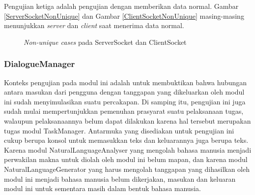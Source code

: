 Pengujian ketiga adalah pengujian dengan memberikan data normal.
Gambar \ref{ServerSocketNonUnique} dan Gambar \ref{ClientSocketNonUnique} masing-masing menunjukkan \textit{server} dan \textit{client} saat menerima data normal.

\begin{figure}
\centering
{}
\caption{\textit{Non-unique cases} pada ServerSocket dan ClientSocket}
\label{SocketNonUnique}
\end{figure}


\subsubsection*{DialogueManager}

Konteks pengujian pada modul ini adalah untuk membuktikan bahwa hubungan antara masukan dari pengguna dengan tanggapan yang dikeluarkan oleh modul ini sudah menyimulasikan suatu percakapan.
Di samping itu, pengujian ini juga sudah mulai mempertunjukkan pemenuhan prasyarat suatu pelaksanaan tugas,
walaupun pelaksanaannya belum dapat dilakukan karena hal tersebut merupakan tugas modul TaskManager.
Antarmuka yang disediakan untuk pengujian ini cukup berupa konsol untuk memasukkan teks dan keluarannya juga berupa teks.
Karena modul NaturalLanguageAnalyser yang mengolah bahasa manusia menjadi perwakilan makna untuk diolah oleh modul ini belum mapan,
dan karena modul NaturalLanguageGenerator yang harus mengolah tanggapan yang dihasilkan oleh modul ini menjadi bahasa manusia belum dikerjakan,
masukan dan keluaran modul ini untuk sementara masih dalam bentuk bahasa manusia.

